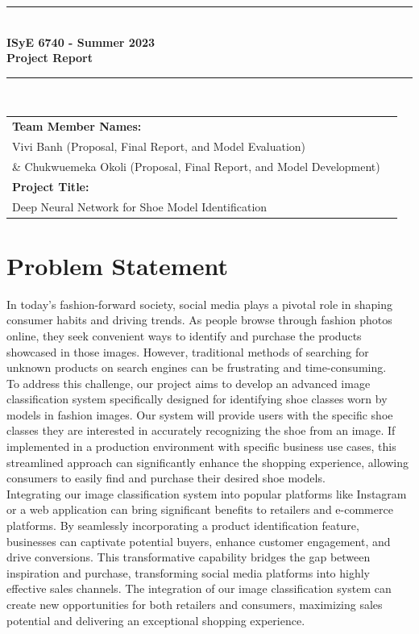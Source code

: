 \documentclass[11pt,a4paper]{article}
\begin{document}

\begin{titlepage}
    \centering
    \vspace*{1cm}
    \rule{\linewidth}{1mm} \\[0.5cm]
    { \Large \bfseries ISyE 6740 - Summer 2023\\[0.2cm]
        Project Report}\\[0.5cm]
    \rule{\linewidth}{1mm} \\[1cm]
    \begin{tabular}{l p{5cm}}
        \textbf{Team Member Names:} \\Vivi Banh (Proposal, Final Report, and Model Evaluation) \\ \& Chukwuemeka Okoli (Proposal, Final Report, and Model Development) \\[10pt]
        \textbf{Project Title:} \\Deep Neural Network for Shoe Model Identification  \\[10pt]
    \end{tabular}
\end{titlepage}

\section{Problem Statement}\label{sec1}
In today's fashion-forward society, social media plays a pivotal role in shaping consumer habits and driving trends. As people browse through fashion photos online, they seek convenient ways to identify and purchase the products showcased in those images. However, traditional methods of searching for unknown products on search engines can be frustrating and time-consuming.  \\

\noindent
To address this challenge, our project aims to develop an advanced image classification system specifically designed for identifying shoe classes worn by models in fashion images. Our system will provide users with the specific shoe classes they are interested in accurately recognizing the shoe from an image. If implemented in a production environment with specific business use cases, this streamlined approach can significantly enhance the shopping experience, allowing consumers to easily find and purchase their desired shoe models.\\

\noindent
Integrating our image classification system into popular platforms like Instagram or a web application can bring significant benefits to retailers and e-commerce platforms. By seamlessly incorporating a product identification feature, businesses can captivate potential buyers, enhance customer engagement, and drive conversions. This transformative capability bridges the gap between inspiration and purchase, transforming social media platforms into highly effective sales channels. The integration of our image classification system can create new opportunities for both retailers and consumers, maximizing sales potential and delivering an exceptional shopping experience. 
	
\end{document}
